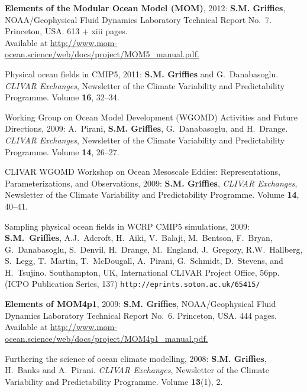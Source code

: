 \begin{etaremune}
\item {\bf Elements of the Modular Ocean Model (MOM)}, 2012: {\bf
    S.M. Grif\/f\/ies}, NOAA/Geophysical Fluid Dynamics Laboratory
  Technical Report No.\ 7. Princeton, USA.  613 + xiii pages. \\
  Available at 
  \href{http://www.mom-ocean.science/web/docs/project/MOM5_manual.pdf}{http://www.mom-ocean.science/web/docs/project/MOM5\_manual.pdf.}

\item Physical ocean fields in CMIP5, 2011:  {\bf S.M. Grif\/f\/ies} and G.\
  Danabasoglu. {\em CLIVAR Exchanges}, Newsletter of
  the Climate Variability and Predictability Programme.  Volume {\bf
    16}, 32--34.

\item Working Group on Ocean Model Development (WGOMD) Activities and
  Future Directions, 2009: A.\ Pirani, {\bf S.M. Grif\/f\/ies}, G.\
  Danabasoglu, and H.\ Drange.  {\em CLIVAR Exchanges}, Newsletter of
  the Climate Variability and Predictability Programme.  Volume {\bf
    14}, 26--27.

\item CLIVAR WGOMD Workshop on Ocean Mesoscale Eddies:
  Representations, Parameterizations, and Observations, 2009: {\bf
    S.M. Grif\/f\/ies}, {\em CLIVAR Exchanges}, Newsletter of the
  Climate Variability and Predictability Programme.  Volume {\bf 14},
  40--41.

\item Sampling physical ocean fields in WCRP CMIP5 simulations, 2009:
  {\bf S.M.\ Grif\/f\/ies}, A.J.\ Adcroft, H.\ Aiki, V.\ Balaji, M.\
  Bentson, F.\ Bryan, G.\ Danabasoglu, S.\ Denvil, H.\ Drange, M.\
  England, J.\ Gregory, R.W.\ Hallberg, S.\ Legg, T.\ Martin, T.\
  McDougall, A.\ Pirani, G.\ Schmidt, D.\ Stevens, and H.\ Tsujino.
  Southampton, UK, International CLIVAR Project Office, 56pp. (ICPO
  Publication Series, 137) {\tt http://eprints.soton.ac.uk/65415/}

\item {\bf Elements of MOM4p1}, 2009: {\bf S.M. Grif\/f\/ies},
  NOAA/Geophysical Fluid Dynamics Laboratory Technical Report No.\
  6. Princeton, USA.  444 pages.  Available at \href{http://www.mom-ocean.science/web/docs/project/MOM4p1_manual.pdf}{http://www.mom-ocean.science/web/docs/project/MOM4p1\_manual.pdf.}
  
\item Furthering the science of ocean climate modelling, 2008: {\bf
    S.M. Grif\/f\/ies}, H.\ Banks and A.\ Pirani.  {\em CLIVAR
    Exchanges}, Newsletter of the Climate Variability and
  Predictability Programme.  Volume {\bf 13}(1), 2.


\end{etaremune}

